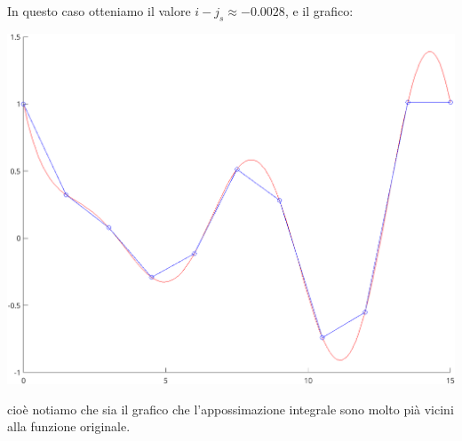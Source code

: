 \documentclass[a4paper,11pt]{article}
\begin{document}
\newpage
In questo caso otteniamo il valore $i - j_s \approx -0.0028$, e il grafico:
\begin{center}
	\includegraphics{../figures/matlab_trapez_int.png}
\end{center}
cioè notiamo che sia il grafico che l'appossimazione integrale sono molto pià vicini alla funzione originale.
\end{document}
